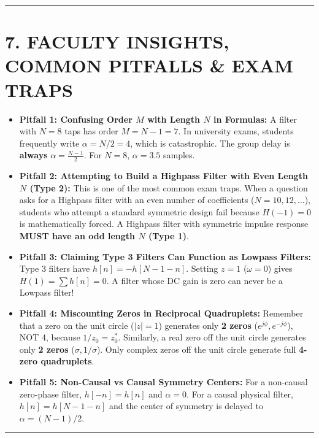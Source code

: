\documentclass[11pt,a4paper]{article}
\begin{document}
\noindent\rule{\textwidth}{0.5pt}

\section{7. FACULTY INSIGHTS, COMMON PITFALLS \& EXAM TRAPS}

\begin{itemize}
    \item \textbf{Pitfall 1: Confusing Order $M$ with Length $N$ in Formulas:}
    A filter with $N = 8$ taps has order $M = N-1 = 7$. In university exams, students frequently write $\alpha = N/2 = 4$, which is catastrophic. The group delay is \textbf{always} $\alpha = \frac{N-1}{2}$. For $N = 8$, $\alpha = 3.5$ samples.
    
    \item \textbf{Pitfall 2: Attempting to Build a Highpass Filter with Even Length $N$ (Type 2):}
    This is one of the most common exam traps. When a question asks for a Highpass filter with an even number of coefficients ($N = 10, 12, \dots$), students who attempt a standard symmetric design fail because $H(-1) = 0$ is mathematically forced. A Highpass filter with symmetric impulse response \textbf{MUST have an odd length $N$ (Type 1)}.
    
    \item \textbf{Pitfall 3: Claiming Type 3 Filters Can Function as Lowpass Filters:}
    Type 3 filters have $h[n] = -h[N-1-n]$. Setting $z = 1$ ($\omega = 0$) gives $H(1) = \sum h[n] = 0$. A filter whose DC gain is zero can never be a Lowpass filter!
    
    \item \textbf{Pitfall 4: Miscounting Zeros in Reciprocal Quadruplets:}
    Remember that a zero on the unit circle ($|z|=1$) generates only \textbf{2 zeros} ($e^{j\phi}, e^{-j\phi}$), NOT 4, because $1/z_0 = z_0^*$. Similarly, a real zero off the unit circle generates only \textbf{2 zeros} ($\sigma, 1/\sigma$). Only complex zeros off the unit circle generate full \textbf{4-zero quadruplets}.
    
    \item \textbf{Pitfall 5: Non-Causal vs Causal Symmetry Centers:}
    For a non-causal zero-phase filter, $h[-n] = h[n]$ and $\alpha = 0$. For a causal physical filter, $h[n] = h[N-1-n]$ and the center of symmetry is delayed to $\alpha = (N-1)/2$.
\end{itemize}

\noindent\rule{\textwidth}{0.5pt}
\end{document}
